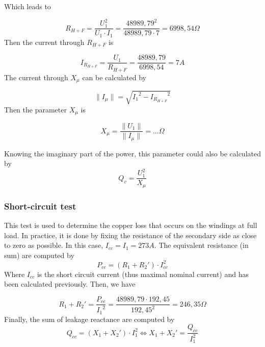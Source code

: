 \documentclass[12pt,a4paper]{report}
\begin{document}
Which leads to

\begin{equation}
    R_{H+F} = \frac{U_1^2}{U_1 \cdot I_1} = \frac{48989,79^2}{48989,79 \cdot 7} = 6998,54 \Omega
\end{equation}
Then the current through $R_{H+F}$ is

\begin{equation}
    I_{R_{H+F}} = \frac{U_1}{R_{H+F}} = \frac{48989,79}{6998,54} = 7 A
\end{equation}
The current through $X_\mu$ can be calculated by 

\begin{equation}
    \|I_{\mu}\| = \sqrt{{I_1}^2 - {I_{R_{H+F}}}^2}
\end{equation}
Then the parameter $X_\mu$ is

\begin{equation}
    X_\mu = \frac{\|U_1\|}{\|I_{\mu}\|} = ... \Omega
\end{equation}

Knowing the imaginary part of the power, this parameter could also be calculated by 
\begin{equation}
   Q_v = \frac{U_1^2}{X_{\mu}}
\end{equation}

\subsubsection{Short-circuit test}
This test is used to determine the copper loss that occurs on the windings at full load. In practice, it is done by fixing the resistance of the secondary side as close to zero as possible. In this case, $I_{cc} = I_1 = 273 A$. The equivalent resistance (in sum) are computed by
\begin{equation}
P_{cc} = (R_1 + R_2') \cdot I_{cc}^2
\end{equation}
Where $I_{cc}$ is the short circuit current (thus maximal nominal current) and has been calculated previously. Then, we have

\begin{equation}
    R_1 + R_2' = \frac{P_{cc}}{{I_1}^2} = \frac{48989,79 \cdot 192,45}{192,45^2} = 246,35 \Omega
\end{equation}
Finally, the sum of leakage reactance are computed by
\begin{equation}
Q_{cc} = (X_1 + X_2') \cdot I_1^2 \iff X_1 + X_2' = \frac{Q_{cc}}{I_1^2}
\end{equation}
\end{document}
